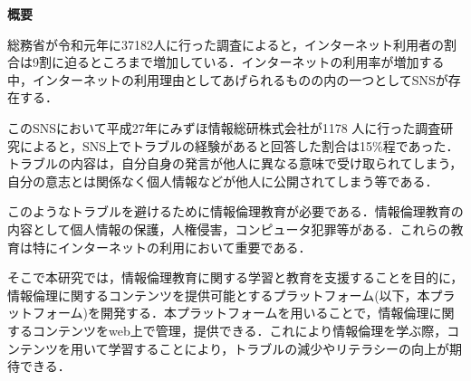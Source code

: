\begin{center}
{\bf \Large 概要}
\end{center}

総務省が令和元年に37182人に行った調査によると，インターネット利用者の割合は9割に迫るところまで増加している\cite{soumu}．インターネットの利用率が増加する中，インターネットの利用理由としてあげられるものの内の一つとしてSNSが存在する．
  
このSNSにおいて平成27年にみずほ情報総研株式会社が1178 人に行った調査研究\cite{mizuho}によると，SNS上でトラブルの経験があると回答した割合は15\%程であった．トラブルの内容は，自分自身の発言が他人に異なる意味で受け取られてしまう，自分の意志とは関係なく個人情報などが他人に公開されてしまう等である．

このようなトラブルを避けるために情報倫理教育が必要である．情報倫理教育の内容として個人情報の保護，人権侵害，コンピュータ犯罪等がある．これらの教育は特にインターネットの利用において重要である\cite{moraru}．

そこで本研究では，情報倫理教育に関する学習と教育を支援することを目的に，情報倫理に関するコンテンツを提供可能とするプラットフォーム(以下，本プラットフォーム)を開発する．本プラットフォームを用いることで，情報倫理に関するコンテンツをweb上で管理，提供できる．これにより情報倫理を学ぶ際，コンテンツを用いて学習することにより，トラブルの減少やリテラシーの向上が期待できる．
